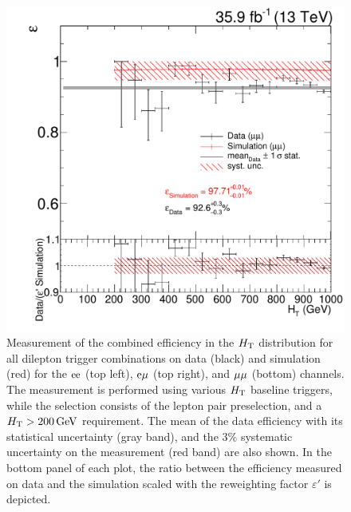 \begin{figure}[htb]
 \includegraphics[width=\pairwidth]{figures/triggerStudies/efficiency_dataHT_trigDilep_ptcuts_MM_ht}
 \caption{Measurement of the combined efficiency in the $H_{\mathrm{T}}$ distribution for all dilepton trigger combinations on data (black) and simulation (red) for the $\mathrm{e}\mathrm{e}$ (top left), $\mathrm{e}\mu$ (top right), and $\mu\mu$ (bottom) channels. The measurement is performed using various $H_{\mathrm{T}}$ baseline triggers, while the selection consists of the lepton pair preselection, and a $H_{\mathrm{T}}>200\,\text{Ge\hspace{-.08em}V}$ requirement. The mean of the data efficiency with its statistical uncertainty (gray band), and the $3\%$ systematic uncertainty on the measurement (red band) are also shown. In the bottom panel of each plot, the ratio between the efficiency measured on data and the simulation scaled with the reweighting factor $\varepsilon'$ is depicted.}
 \label{fig:app_triggEff3}
\end{figure}
